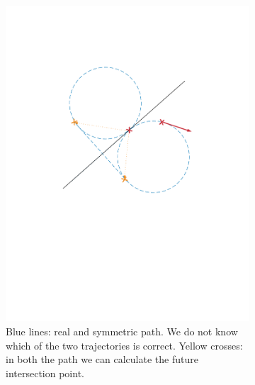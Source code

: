 \begin{figure}[!htbp]
   \begin{subfigure}[b]{0.45\textwidth}
        \includegraphics[width=\textwidth]{img/intersection_3.pdf}
        \caption{Blue lines: real and symmetric path. We do not know which of the two trajectories is correct. Yellow crosses: in both the path we can calculate the future intersection point.}
        \label{fig:three}
   \end{subfigure}\hfill
    \begin{subfigure}[b]{0.45\textwidth}

\end{subfigure}
\end{figure}
